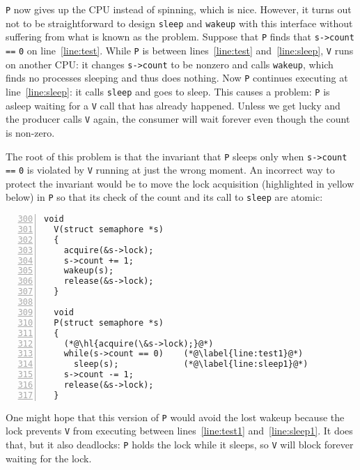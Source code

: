 
\lstinline{P}
now gives up the CPU instead of spinning, which is nice.
However, it turns out not to be straightforward to design
\lstinline{sleep}
and 
\lstinline{wakeup}
with this interface without suffering
from what is known as the  problem.
Suppose that
\lstinline{P}
finds that
\lstinline{s->count}
\lstinline{==}
\lstinline{0} 
on line~\ref{line:test}.
While
\lstinline{P}
is between lines~\ref{line:test} and~\ref{line:sleep},
\lstinline{V}
runs on another CPU:
it changes
\lstinline{s->count}
to be nonzero and calls
\lstinline{wakeup},
which finds no processes sleeping and thus does nothing.
Now
\lstinline{P}
continues executing at line~\ref{line:sleep}:
it calls
\lstinline{sleep}
and goes to sleep.
This causes a problem:
\lstinline{P}
is asleep waiting for a \lstinline{V} call
that has already happened.
Unless we get lucky and the producer calls
\lstinline{V} again, the consumer will wait
forever even
though the count is non-zero.

The root of this problem is that the
invariant that
\lstinline{P}
sleeps only when
\lstinline{s->count}
\lstinline{==}
\lstinline{0}
is violated by 
\lstinline{V}
running at just the wrong moment.
An incorrect way to protect the invariant would be to 
move the lock acquisition (highlighted in yellow below) in
\lstinline{P}
so that its check of the count and its call to \lstinline{sleep}
are atomic:
\begin{lstlisting}[numbers=left,firstnumber=300]
  void
  V(struct semaphore *s)
  {
    acquire(&s->lock);
    s->count += 1;
    wakeup(s);
    release(&s->lock);
  }
  
  void
  P(struct semaphore *s)
  {
    (*@\hl{acquire(\&s->lock);}@*)
    while(s->count == 0)    (*@\label{line:test1}@*)
      sleep(s);             (*@\label{line:sleep1}@*)
    s->count -= 1;
    release(&s->lock);
  }
\end{lstlisting}
One might hope that this version of
\lstinline{P}
would avoid the lost wakeup because the lock prevents
\lstinline{V}
from executing between lines~\ref{line:test1} and~\ref{line:sleep1}.
It does that, but it also deadlocks:
\lstinline{P}
holds the lock while it sleeps,
so \lstinline{V} will block forever waiting for the lock.

